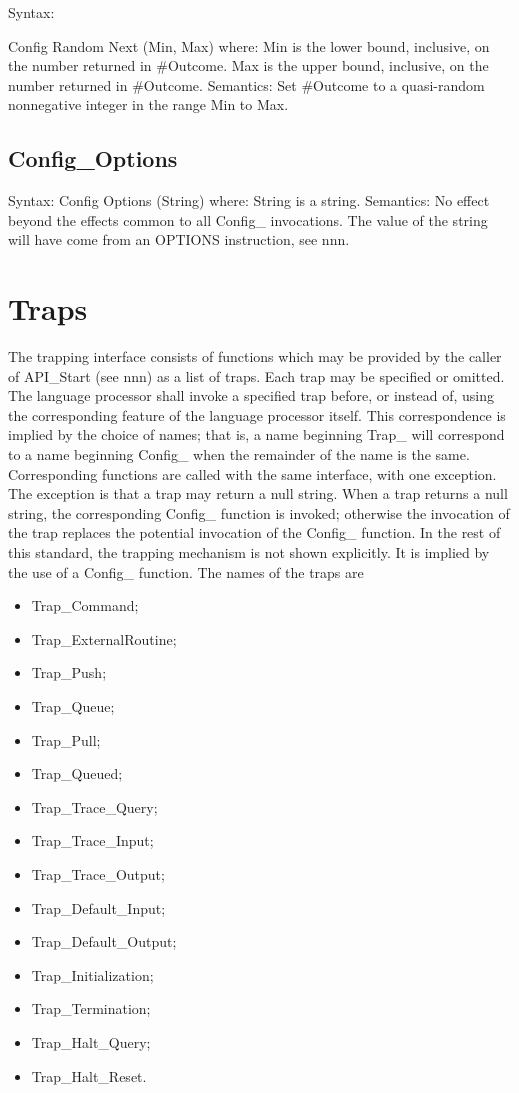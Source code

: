 Syntax:

Config Random Next (Min, Max) where: Min is the lower bound, inclusive,
on the number returned in \#Outcome. Max is the upper bound, inclusive,
on the number returned in \#Outcome. Semantics: Set \#Outcome to a
quasi-random nonnegative integer in the range Min to Max.

\hypertarget{config_options}{%
\subsection{Config\_Options}\label{config_options}}

Syntax: Config Options (String) where: String is a string. Semantics: No
effect beyond the effects common to all Config\_ invocations. The value
of the string will have come from an OPTIONS instruction, see nnn.

\hypertarget{traps}{%
\section{Traps}\label{traps}}

The trapping interface consists of functions which may be provided by
the caller of API\_Start (see nnn) as a list of traps. Each trap may be
specified or omitted. The language processor shall invoke a specified
trap before, or instead of, using the corresponding feature of the
language processor itself. This correspondence is implied by the choice
of names; that is, a name beginning Trap\_ will correspond to a name
beginning Config\_ when the remainder of the name is the same.
Corresponding functions are called with the same interface, with one
exception. The exception is that a trap may return a null string. When a
trap returns a null string, the corresponding Config\_ function is
invoked; otherwise the invocation of the trap replaces the potential
invocation of the Config\_ function. In the rest of this standard, the
trapping mechanism is not shown explicitly. It is implied by the use of
a Config\_ function. The names of the traps are

\begin{itemize}
\item
  Trap\_Command;
\item
  Trap\_ExternalRoutine;
\item
  Trap\_Push;
\item
  Trap\_Queue;
\item
  Trap\_Pull;
\item
  Trap\_Queued;
\item
  Trap\_Trace\_Query;
\item
  Trap\_Trace\_Input;
\item
  Trap\_Trace\_Output;
\item
  Trap\_Default\_Input;
\item
  Trap\_Default\_Output;
\item
  Trap\_Initialization;
\item
  Trap\_Termination;
\item
  Trap\_Halt\_Query;
\item
  Trap\_Halt\_Reset.
\end{itemize}


